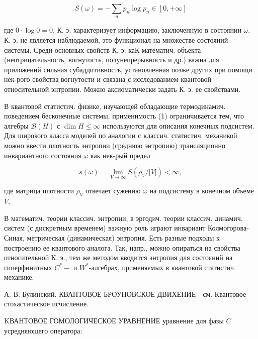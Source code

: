 \documentclass[10pt]{article}
\begin{document}
\[

S(\omega)=-\sum_{n} p_{n} \log p_{n} \in[0,+\infty]

\]



где $0 \cdot \log 0=0$. К. э. характеризует информацию, заключенную в состоянии $\omega$. К. э. не является наблюдаемой, это функционал на множестве состояний системы. Среди основных свойств К. э. каК математич. объекта (неотрицательность, вогнутость, полунепрерывность и др.) важна для приложений сильная субаддитивность, установленная позже других при помощи нек-рого свойства вогнутости и связана с исследованием квантовой относительной энтропии. Можно аксиоматически задать К. э. ее свойствами.



В квантовой статистич. физике, изучающей обладающие термодинамич. поведением бесконечные системы, применимость (1) ограничивается тем, что алгебры $\mathscr{B}(H)$ с $\operatorname{dim} H \leqslant \infty$ используются для описания конечных подсистем. Для широкого класса моделей по аналогии с классич. статистич. механикой можно ввести плотность энтропии (среднюю энтропию) трансляционно инвариантного состояния $\omega$ как нек-рый предел



\[

s(\omega)=\lim _{V \rightarrow \infty} S\left(\rho_{V} /|V|\right)<\infty,

\]



где матрица плотности $\rho_{V}$ отвечает сужению $\omega$ на подсистему в конечном объеме $V$.



В математич. теории классич. энтропии, в эргодич. теории классич. динамич. систем (с дискретным временем) важную роль играют инвариант Колмогорова-Синая, метрическая (динамическая) энтропия. Есть разные подходы к построению ее квантового аналога. Так, напр., можно опираться на свойства относительной К. э., тем же методом вводится энтропия для состояний на гиперфинитных $C^{*}-$ и $W^{*}$-алгебрах, применяемых в квантовой статистич. механике.



А. В. Булинский. КВАНТОВОЕ БРОУНОВСКОЕ ДВИХЕНИЕ - см. Квантовое стохастическое исчисление.



KВАНТОВОЕ ГОМОЛОГИЧЕСКОЕ УРАВНЕНИЕ уравнение для фазы $C$ усредняющего оператора:
\end{document}
